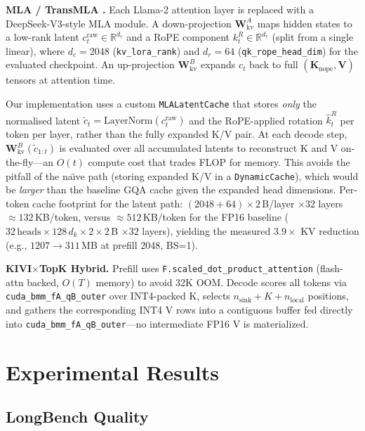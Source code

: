 \documentclass[conference]{IEEEtran}
\begin{document}
\textbf{MLA / TransMLA \cite{transmla}.}  Each Llama-2 attention layer
is replaced with a DeepSeek-V3-style MLA module.  A down-projection
$\mathbf{W}_{\text{kv}}^A$ maps hidden states to a low-rank latent
$c_t^{\text{raw}} \in \mathbb{R}^{d_c}$ and a RoPE component
$k_t^R \in \mathbb{R}^{d_r}$ (split from a single linear),
where $d_c\!=\!2048$ (\texttt{kv\_lora\_rank}) and $d_r\!=\!64$
(\texttt{qk\_rope\_head\_dim}) for the evaluated checkpoint.  An
up-projection $\mathbf{W}_{\text{kv}}^B$ expands $c_t$ back to full
$(\mathbf{K}_{\text{nope}},\mathbf{V})$ tensors at attention time.

Our implementation uses a custom \texttt{MLALatentCache} that stores
\emph{only} the normalised latent $\tilde{c}_t =
\text{LayerNorm}(c_t^{\text{raw}})$ and the RoPE-applied rotation
$\hat{k}_t^R$ per token per layer, rather than the fully expanded K/V
pair.  At each decode step, $\mathbf{W}_{\text{kv}}^B(\tilde{c}_{1:t})$
is evaluated over all accumulated latents to reconstruct K and V
on-the-fly---an $O(t)$ compute cost that trades FLOP for memory.  This
avoids the pitfall of the na\"{\i}ve path (storing expanded K/V in a
\texttt{DynamicCache}), which would be \emph{larger} than the baseline
GQA cache given the expanded head dimensions.  Per-token cache
footprint for the latent path:
$(2048 + 64) \times 2$\,B/layer $\times 32$ layers
$\approx 132$\,KB/token, versus $\approx 512$\,KB/token for the
FP16 baseline ($32\,\text{heads}\times 128\,d_k \times 2 \times 2$\,B
$\times 32$ layers), yielding the measured $3.9\times$ KV reduction
(e.g., $1207 \rightarrow 311$\,MB at prefill 2048, BS=1).

\textbf{KIVI$\times$TopK Hybrid.}  Prefill uses
\texttt{F.scaled\_dot\_product\_attention} (flash-attn backed,
$O(T)$ memory) to avoid 32K OOM.  Decode scores all tokens via
\texttt{cuda\_bmm\_fA\_qB\_outer} over INT4-packed K, selects
$n_\text{sink}+K+n_\text{local}$ positions, and gathers the
corresponding INT4 V rows into a contiguous buffer fed directly into
\texttt{cuda\_bmm\_fA\_qB\_outer}---no intermediate FP16 V is
materialized.

\section{Experimental Results}

\subsection{LongBench Quality}
\end{document}

